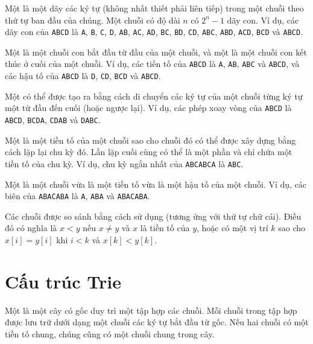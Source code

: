 Một  là một dãy
các ký tự (không nhất thiết phải liên tiếp)
trong một chuỗi theo thứ tự ban đầu của chúng.
Một chuỗi có độ dài $n$ có $2^n-1$ dãy con.
Ví dụ, các dãy con của
\texttt{ABCD} là
\texttt{A}, \texttt{B}, \texttt{C}, \texttt{D},
\texttt{AB}, \texttt{AC}, \texttt{AD},
\texttt{BC}, \texttt{BD}, \texttt{CD},
\texttt{ABC}, \texttt{ABD}, \texttt{ACD},
\texttt{BCD} và \texttt{ABCD}.


Một  là một chuỗi con bắt đầu từ đầu
của một chuỗi,
và một  là một chuỗi con kết thúc ở cuối
của một chuỗi.
Ví dụ,
các tiền tố của \texttt{ABCD} là
\texttt{A}, \texttt{AB}, \texttt{ABC} và \texttt{ABCD},
và các hậu tố của \texttt{ABCD} là
\texttt{D}, \texttt{CD}, \texttt{BCD} và \texttt{ABCD}.


Một  có thể được tạo ra bằng cách di chuyển
các ký tự của một chuỗi từng ký tự một từ đầu
đến cuối (hoặc ngược lại).
Ví dụ, các phép xoay vòng của \texttt{ABCD} là
\texttt{ABCD}, \texttt{BCDA}, \texttt{CDAB} và \texttt{DABC}.


Một  là một tiền tố của một chuỗi sao cho
chuỗi đó có thể được xây dựng bằng cách lặp lại chu kỳ đó.
Lần lặp cuối cùng có thể là một phần và chỉ chứa
một tiền tố của chu kỳ.
Ví dụ, chu kỳ ngắn nhất của
\texttt{ABCABCA} là \texttt{ABC}.


Một  là một chuỗi vừa là
một tiền tố vừa là một hậu tố của một chuỗi.
Ví dụ, các biên của \texttt{ABACABA}
là \texttt{A}, \texttt{ABA} và \texttt{ABACABA}.


Các chuỗi được so sánh bằng cách sử dụng 
(tương ứng với thứ tự chữ cái).
Điều đó có nghĩa là $x<y$ nếu $x \neq y$ và $x$ là tiền tố của $y$,
hoặc có một vị trí $k$ sao cho
$x[i]=y[i]$ khi $i<k$ và $x[k]<y[k]$.

\section{Cấu trúc Trie}


Một  là một cây có gốc
duy trì một tập hợp các chuỗi.
Mỗi chuỗi trong tập hợp được lưu trữ dưới dạng
một chuỗi các ký tự bắt đầu từ gốc.
Nếu hai chuỗi có một tiền tố chung,
chúng cũng có một chuỗi chung trong cây.

